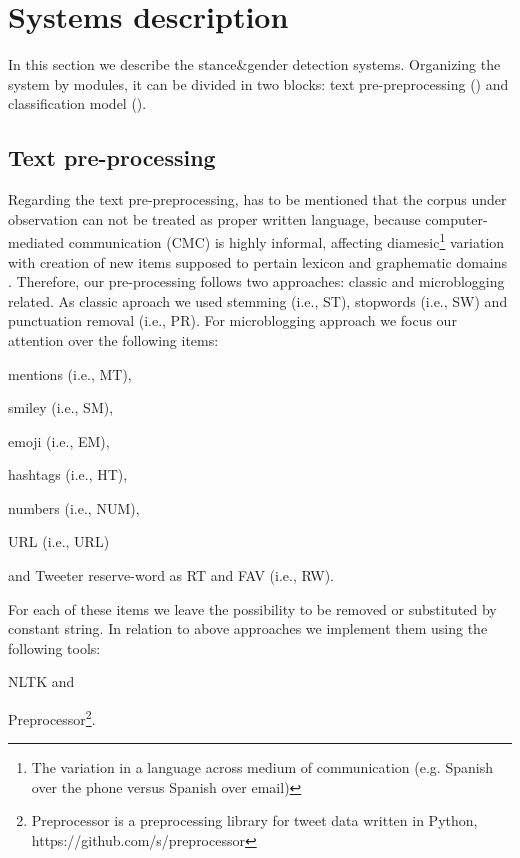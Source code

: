 \section{Systems description} \label{sec:system}

In this section we describe the stance\&gender detection systems. Organizing the system by modules, it can be divided in two blocks: text pre-preprocessing () and classification model (). 


\subsection{Text pre-processing} \label{subsec:preprocessing}
Regarding the text pre-preprocessing, has to be mentioned that the corpus under observation can not be treated as proper written language, because computer-mediated communication (CMC) is highly informal, affecting diamesic\footnote{The variation in a language across medium of communication (e.g. Spanish over the phone versus Spanish over email)} variation with creation of new items supposed to pertain lexicon and graphematic domains \cite{bazzanella2011oscillazioni,cerruti2013netspeak}.
Therefore, our pre-processing follows two approaches: classic and microblogging related.
As classic aproach we used stemming (i.e., ST), stopwords (i.e., SW) and punctuation removal (i.e., PR).
For microblogging approach we focus our attention over the following items:
\begin{enumerate*}
\item mentions (i.e., MT),
\item smiley (i.e., SM),
\item emoji (i.e., EM),
\item hashtags (i.e., HT),
\item numbers (i.e., NUM),
\item URL (i.e., URL)
\item and Tweeter reserve-word as RT and FAV (i.e., RW).
\end{enumerate*}
For each of these items we leave the possibility to be removed or substituted by constant string.
In relation to above approaches we implement them using the following tools:
\begin{enumerate*}
\item NLTK \cite{nltk} and 
\item Preprocessor\footnote{Preprocessor is a preprocessing library for tweet data written in Python, https://github.com/s/preprocessor}.
\end{enumerate*}



